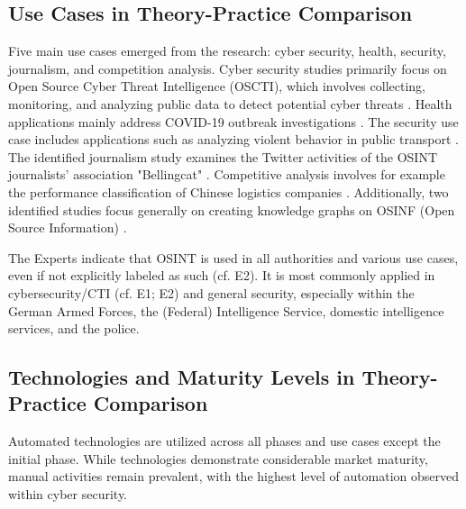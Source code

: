 \documentclass[10pt]{article}
\begin{document}
\subsection{Use Cases in Theory-Practice Comparison}

Five main use cases emerged from the research: cyber security, health, security, journalism,
and competition analysis. Cyber security studies primarily focus on Open Source Cyber Threat
Intelligence (OSCTI), which involves collecting, monitoring, and analyzing public
data to detect potential cyber threats \cite{Ahuja.2022,AlDmour.2023}.
Health applications mainly address COVID-19 outbreak investigations \cite{Kpozehouen.2020}.
The security use case includes applications such as
analyzing violent behavior in public transport \cite{Nobili.2021}. The identified journalism study examines the
Twitter activities of the OSINT journalists' association "Bellingcat" \cite{Bar.2023}. Competitive analysis
involves for example the performance classification of Chinese logistics companies \cite{Tao.2023}.
Additionally, two identified studies focus generally on creating knowledge graphs on OSINF (Open Source Information) \cite{Hu.2023, Ma.2022}.

The Experts indicate that OSINT is used in all authorities and various use cases, even if not explicitly labeled as such (cf. E2). It is most commonly applied in cybersecurity/CTI (cf. E1; E2) and general security, especially within the German Armed Forces, the (Federal) Intelligence Service, domestic intelligence services, and the police.

\subsection{Technologies and Maturity Levels in Theory-Practice Comparison}

Automated technologies are utilized across all phases and use cases except the initial phase.
While technologies demonstrate considerable market maturity, manual activities remain prevalent, with the highest level of automation observed within cyber security.
\end{document}
